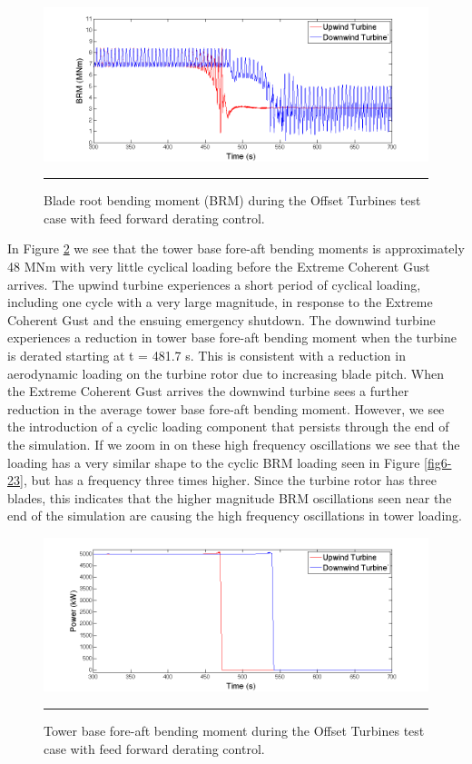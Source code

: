 \begin{figure}[htbp] \label{fig6-24}
	\centering
		\includegraphics[trim = {1cm 0 2cm 0}, clip, width = \linewidth]{Figures/ch6Figures/fig6-24.png}
		\rule{35em}{0.5pt}
	\caption{Blade root bending moment (BRM) during the Offset Turbines test case with feed forward derating control.}
\end{figure}

In Figure \ref{fig6-25} we see that the tower base fore-aft bending moments is approximately 48 MNm with very little cyclical loading before the Extreme Coherent Gust arrives. The upwind turbine experiences a short period of cyclical loading, including one cycle with a very large magnitude, in response to the Extreme Coherent Gust and the ensuing emergency shutdown. The downwind turbine experiences a reduction in tower base fore-aft bending moment when the turbine is derated starting at t = 481.7 s. This is consistent with a reduction in aerodynamic loading on the turbine rotor due to increasing blade pitch. When the Extreme Coherent Gust arrives the downwind turbine sees a further reduction in the average tower base fore-aft bending moment. However, we see the introduction of a cyclic loading component that persists through the end of the simulation. If we zoom in on these high frequency oscillations we see that the loading has a very similar shape to the cyclic BRM loading seen in Figure \ref{fig6-23}, but has a frequency three times higher. Since the turbine rotor has three blades, this indicates that the higher magnitude BRM oscillations seen near the end of the simulation are causing the high frequency oscillations in tower loading. 

\begin{figure}[htbp] \label{fig6-25}
	\centering
		\includegraphics[trim = {1cm 0 2cm 0}, clip, width = \linewidth]{Figures/ch6Figures/fig6-16.png}
		\rule{35em}{0.5pt}
	\caption{Tower base fore-aft bending moment during the Offset Turbines test case with feed forward derating control.}
\end{figure}

